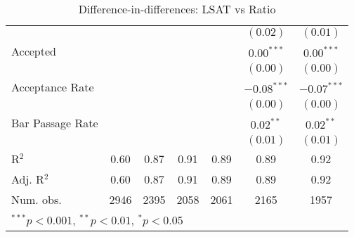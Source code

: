 \begin{table}
\begin{center}
\begin{tabular}{l c c c c c c }
                      &                &                &                &                & $(0.02)$       & $(0.01)$       \\
Accepted              &                &                &                &                & $0.00^{***}$   & $0.00^{***}$   \\
                      &                &                &                &                & $(0.00)$       & $(0.00)$       \\
Acceptance Rate       &                &                &                &                & $-0.08^{***}$  & $-0.07^{***}$  \\
                      &                &                &                &                & $(0.00)$       & $(0.00)$       \\
Bar Passage Rate      &                &                &                &                & $0.02^{**}$    & $0.02^{**}$    \\
                      &                &                &                &                & $(0.01)$       & $(0.01)$       \\
\hline
R$^2$                 & 0.60           & 0.87           & 0.91           & 0.89           & 0.89           & 0.92           \\
Adj. R$^2$            & 0.60           & 0.87           & 0.91           & 0.89           & 0.89           & 0.92           \\
Num. obs.             & 2946           & 2395           & 2058           & 2061           & 2165           & 1957           \\
\hline
\multicolumn{7}{l}{\scriptsize{$^{***}p<0.001$, $^{**}p<0.01$, $^*p<0.05$}}
\end{tabular}
\caption{Difference-in-differences: LSAT vs Ratio}
\label{tab:lsat-ratio}
\end{center}
\end{table}
\clearpage
